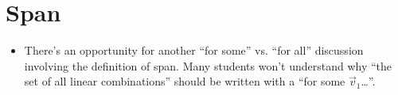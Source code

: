 \documentclass{problemset}
\newcommand{\bookonlynewpage}{\begin{bookonly}\newpage\end{bookonly}}
\begin{document}
	\bookonlynewpage
\section*{Span}
	\begin{annotation}
		\begin{notes}
			\begin{itemize}
				\item There's an opportunity for another ``for some'' vs. ``for all''
					discussion involving the definition of span. Many students won't
					understand why ``the set of all linear combinations'' should
					be written with a ``for some $\vec v_1$\ldots''.
			\end{itemize}
		\end{notes}
	\end{annotation}

\end{document}
